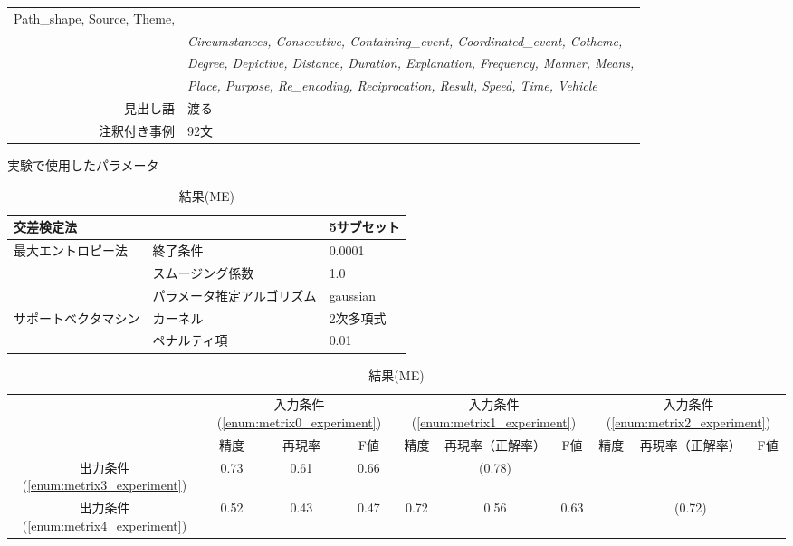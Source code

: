 \documentclass[japanese]{jnlp_1.2b}
\begin{document}
\begin{table}[t]
\begin{center}
\begin{tabular}{rl}
{   Path\_shape, Source, Theme,}\\
            & {\it Circumstances, Consecutive, Containing\_event,
   Coordinated\_event, Cotheme,}\\
            & {\it Degree, Depictive, Distance, Duration, Explanation,
   Frequency, Manner, Means,}\\
            & {\it Place, Purpose, Re\_encoding, Reciprocation, Result,
   Speed, Time, Vehicle} \\
   見出し語 & 渡る \\
   注釈付き事例 & 92文 \\
   \hline
  \end{tabular}
 \end{center}
\end{table}

\begin{table}[t]
 \begin{center}
  \caption{実験で使用したパラメータ}
  \label{tbl:param_experiment}
  \begin{tabular}{lll}
   \hline
   交差検定法 & & 5サブセット \\
   \hline
   最大エントロピー法 & 終了条件 & 0.0001 \\
   & スムージング係数 & 1.0 \\
   & パラメータ推定アルゴリズム & gaussian \\
   \hline
   サポートベクタマシン & カーネル & 2次多項式 \\
   & ペナルティ項 & 0.01 \\
   \hline
  \end{tabular}
    \par\vspace{20pt}
  \caption{結果(ME)}
  \label{tbl:result_all_experiment_me}
  \setlength{\tabcolsep}{1.5mm}
  \begin{tabular}{c|ccc|ccc|ccc}
   \hline
   & \multicolumn{3}{|c|}{入力条件(\ref{enum:metrix0_experiment})}
   & \multicolumn{3}{|c|}{入力条件(\ref{enum:metrix1_experiment})}
   & \multicolumn{3}{|c}{入力条件(\ref{enum:metrix2_experiment})} \\
   & 精度 & 再現率 & F値
   & 精度 & 再現率（正解率） & F値
   & 精度 & 再現率（正解率） & F値 \\
   \hline
   出力条件(\ref{enum:metrix3_experiment}) & 0.73 & 0.61 & 0.66  &  &
   (0.78) &  &  &  & \\
   出力条件(\ref{enum:metrix4_experiment}) & 0.52 & 0.43 & 0.47  & 0.72
   & 0.56 & 0.63  &  & (0.72) & \\

\end{tabular}
\end{center}
\end{table}
\end{document}
